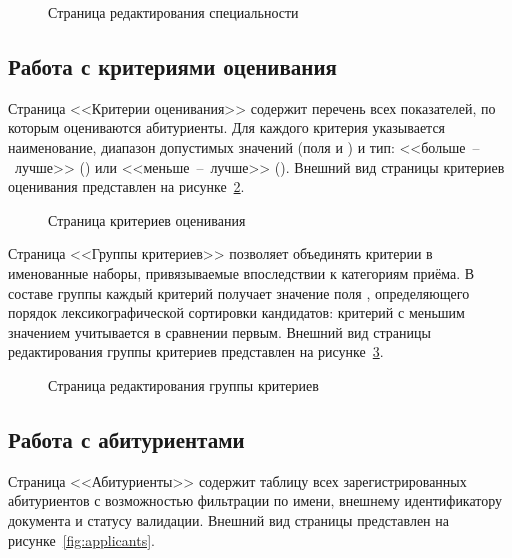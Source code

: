 \begin{figure}[htbp]
\centering
{}
\caption{Страница редактирования специальности}
\label{fig:specialtyedit}
\end{figure}

\subsection{Работа с критериями оценивания}

Страница <<Критерии оценивания>> содержит перечень всех показателей, по которым оцениваются абитуриенты.
Для каждого критерия указывается наименование, диапазон допустимых значений (поля  и ) и тип: <<больше~--~лучше>> () или <<меньше~--~лучше>> ().
Внешний вид страницы критериев оценивания представлен на рисунке~\ref{fig:criteria}.

\begin{figure}[htbp]
\centering
{}
\caption{Страница критериев оценивания}
\label{fig:criteria}
\end{figure}

Страница <<Группы критериев>> позволяет объединять критерии в именованные наборы, привязываемые впоследствии к категориям приёма.
В составе группы каждый критерий получает значение поля , определяющего порядок лексикографической сортировки кандидатов: критерий с меньшим значением  учитывается в сравнении первым.
Внешний вид страницы редактирования группы критериев представлен на рисунке~\ref{fig:criteriagroup}.

\begin{figure}[htbp]
\centering
{}
\caption{Страница редактирования группы критериев}
\label{fig:criteriagroup}
\end{figure}

\subsection{Работа с абитуриентами}

Страница <<Абитуриенты>> содержит таблицу всех зарегистрированных абитуриентов с возможностью фильтрации по имени, внешнему идентификатору документа и статусу валидации.
Внешний вид страницы представлен на рисунке~\ref{fig:applicants}.

